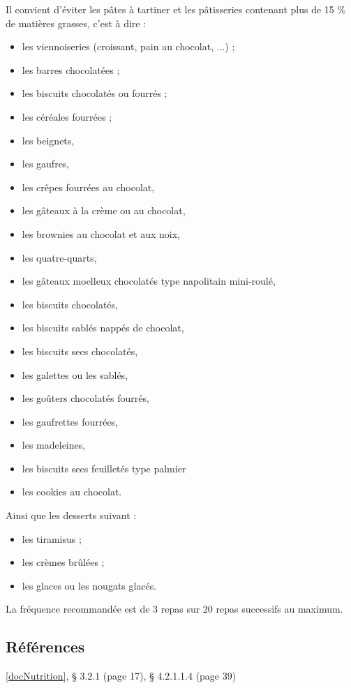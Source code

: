 Il convient d'éviter les pâtes à tartiner et les pâtisseries contenant plus de 15 \% de matières grasses, c'est à dire :
\begin{itemize}
	\item les viennoiseries (croissant, pain au chocolat, ...) ;
	\item les barres chocolatées ;
	\item les biscuits chocolatés ou fourrés ;
	\item les céréales fourrées ;
	\item les beignets,
	\item les gaufres,
	\item les crêpes fourrées au chocolat,
	\item les gâteaux à la crème ou au chocolat,
	\item les brownies au chocolat et aux noix,
	\item les quatre-quarts,
	\item les gâteaux moelleux chocolatés type napolitain mini-roulé,
	\item les biscuits chocolatés,
	\item les biscuits sablés nappés de chocolat,
	\item les biscuits secs chocolatés,
	\item les galettes ou les sablés,
	\item les goûters chocolatés fourrés,
	\item les gaufrettes fourrées,
	\item les madeleines,
	\item les biscuits secs feuilletés type palmier
	\item les cookies au chocolat.
\end{itemize}

Ainsi que les desserts suivant :
\begin{itemize}
\item les tiramisus ;
\item les crèmes brûlées ;
\item les glaces ou les nougats glacés.
\end{itemize}

La fréquence recommandée est de 3 repas sur 20 repas successifs au maximum.

\subsection{Références}

\ref{docNutrition}, § 3.2.1 (page 17), § 4.2.1.1.4 (page 39)
